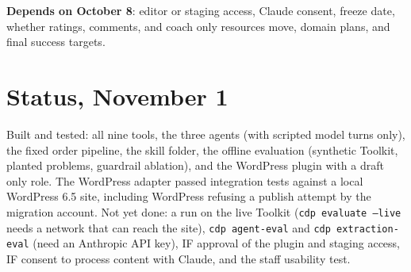 \textbf{Depends on October 8}: editor or staging access, Claude consent, freeze date, whether ratings, comments, and coach only resources move, domain plans, and final success targets.

\section{Status, November 1}
Built and tested: all nine tools, the three agents (with scripted model turns only), the fixed order pipeline, the skill folder, the offline evaluation (synthetic Toolkit, planted problems, guardrail ablation), and the WordPress plugin with a draft only role. The WordPress adapter passed integration tests against a local WordPress 6.5 site, including WordPress refusing a publish attempt by the migration account. Not yet done: a run on the live Toolkit (\texttt{cdp evaluate --live} needs a network that can reach the site), \texttt{cdp agent-eval} and \texttt{cdp extraction-eval} (need an Anthropic API key), IF approval of the plugin and staging access, IF consent to process content with Claude, and the staff usability test.


